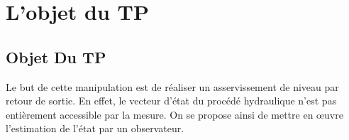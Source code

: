 \chapter{ L'objet du TP }
 
  \section{Objet Du TP}
      Le but de cette manipulation est de réaliser un asservissement de niveau par retour de sortie. En effet, le vecteur d’état du procédé hydraulique n’est pas entièrement accessible par la mesure. On se propose ainsi de mettre en œuvre l’estimation de l’état par un observateur.
  
  